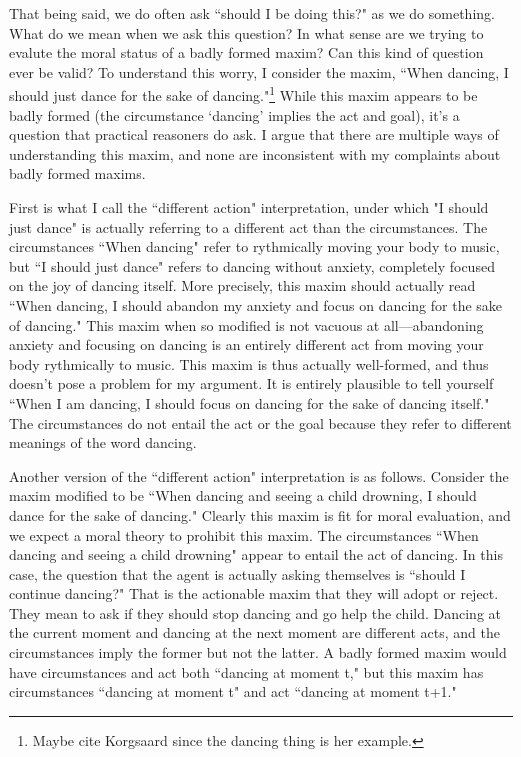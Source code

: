 \begin{isabellebody}
\begin{isamarkuptext}
That being said, we do often ask ``should I be doing this?" as we do something. What do we mean when 
we ask this question? In what sense are we trying to evalute the moral status of a badly formed maxim?
Can this kind of question ever be valid? To understand this worry, I consider the maxim, 
``When dancing, I should just dance for the sake of dancing."\footnote{Maybe cite Korgsaard since the
dancing thing is her example.} While this maxim appears to be badly formed (the 
circumstance `dancing' implies the act and goal), it's a question that practical reasoners 
do ask. I argue that there are multiple ways of understanding this maxim, and none are inconsistent with 
my complaints about badly formed maxims. 

First is what I call the ``different action" interpretation, under which "I should just dance" is 
actually referring to a different act than the circumstances. The circumstances ``When dancing" refer 
to rythmically moving your body to music, but ``I should just dance" refers to dancing without anxiety, 
completely focused on the joy of dancing itself. More precisely, this maxim should actually read ``When 
dancing, I should abandon my anxiety and focus on dancing for the sake of dancing." This maxim when so 
modified is not vacuous at all—abandoning anxiety and focusing on dancing is an entirely different act 
from moving your body rythmically to music. This maxim is thus actually well-formed, and thus doesn't
pose a problem for my argument. It is entirely plausible to tell yourself ``When I am dancing, I should focus 
on dancing for the sake of dancing itself." The circumstances do not entail the act or the goal because 
they refer to different meanings of the word dancing. 

Another version of the ``different action" interpretation is as follows. Consider the maxim modified to 
be ``When dancing and seeing a child drowning, I should dance for the sake of dancing." Clearly this 
maxim is fit for moral evaluation, and we expect a moral theory to prohibit this maxim. The circumstances 
``When dancing and seeing a child drowning" appear to entail the act of dancing. In this case, the question 
that the agent is actually asking themselves is ``should I continue dancing?" That is the actionable 
maxim that they will adopt or reject. They mean to ask if they should stop dancing and go help the child. 
Dancing at the current moment and dancing at the next moment are different acts, and the circumstances 
imply the former but not the latter. A badly formed maxim would have circumstances and act both 
``dancing at moment t," but this maxim has circumstances ``dancing at moment t" and act ``dancing 
at moment t+1."


\end{isamarkuptext}
\end{isabellebody}

